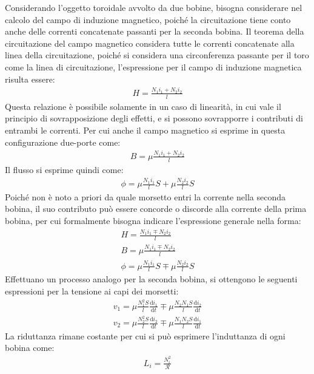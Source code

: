 \documentclass{article}
\newcommand{\df}{\mathrm{d}}
\numberwithin{equation}{subsection}
\begin{document}
Considerando l'oggetto toroidale avvolto da due bobine, bisogna considerare nel calcolo del campo di induzione magnetico, poiché la circuitazione tiene conto anche delle 
correnti concatenate passanti per la seconda bobina. Il teorema della circuitazione del campo magnetico considera tutte le correnti concatenate alla linea della circuitazione, 
poiché si considera una circonferenza passante per il toro come la linea di circuitazione, l'espressione per il campo di induzione magnetica risulta essere:
\begin{gather*}
    H=\displaystyle\frac{N_1i_1+N_2i_2}{l}
\end{gather*}
Questa relazione è possibile solamente in un caso di linearità, in cui vale il principio di sovrapposizione degli effetti, e si possono sovrapporre i contributi di 
entrambi le correnti. 
Per cui anche il campo magnetico si esprime in questa configurazione due-porte come:
\begin{gather*}
    B=\mu\displaystyle\frac{N_1i_1+N_2i_2}{l}
\end{gather*}
Il flusso si esprime quindi come:
\begin{gather*}
    \phi=\mu\displaystyle\frac{N_1i_1}{l}S+\mu\frac{N_2i_2}{l}S
\end{gather*}
Poiché non è noto a priori da quale morsetto entri la corrente nella seconda bobina, il suo contributo può essere concorde o discorde alla corrente della prima bobina, per cui 
formalmente bisogna indicare l'espressione generale nella forma:
\begin{gather*}
    H=\displaystyle\frac{N_1i_1\mp N_2i_2}{l}\\
    B=\mu\displaystyle\frac{N_1i_1\mp N_2i_2}{l}\\
    \phi=\mu\displaystyle\frac{N_1i_1}{l}S\mp\mu\frac{N_2i_2}{l}S
\end{gather*}
Effettuano un processo analogo per la seconda bobina, si ottengono le seguenti espressioni per la tensione ai capi dei morsetti: 
\begin{gather*}
    v_1=\displaystyle\mu\frac{N_1^2S}{l}\frac{\df i_1}{\df t}\mp\mu\frac{N_2N_1S}{l}\frac{\df i_2}{\df t}\\
    v_2=\displaystyle\mu\frac{N_2^2S}{l}\frac{\df i_2}{\df t}\mp\mu\frac{N_1N_2S}{l}\frac{\df i_1}{\df t}
\end{gather*}
La riduttanza rimane costante per cui si può esprimere l'induttanza di ogni bobina come:
\begin{gather*}
    L_i=\displaystyle\frac{N_i^2}{\mathscr{R}}
\end{gather*}
\end{document}
